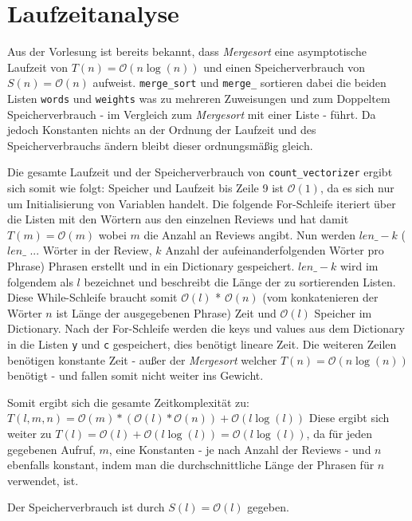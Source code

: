 \documentclass[ngerman]{scrartcl}
\newcommand{\code}{\texttt}
\begin{document}
\section{Laufzeitanalyse}
\label{sec:runtime}
Aus der Vorlesung ist bereits bekannt, dass \emph{Mergesort} eine asymptotische Laufzeit von $T(n) = \mathcal{O}(n\log(n))$ und einen Speicherverbrauch von $S(n) = \mathcal{O}(n)$ aufweist. 
\code{merge\_sort} und \code{merge\_} sortieren dabei die beiden Listen \code{words} und \code{weights} was zu mehreren Zuweisungen und zum Doppeltem Speicherverbrauch - im Vergleich zum \emph{Mergesort} mit einer Liste - führt. Da jedoch Konstanten nichts an der Ordnung der Laufzeit und des Speicherverbrauchs ändern bleibt dieser ordnungsmäßig gleich. 

Die gesamte Laufzeit und der Speicherverbrauch von \code{count\_vectorizer} ergibt sich somit wie folgt: Speicher und Laufzeit bis Zeile 9 ist $\mathcal{O}(1)$, da es sich nur um Initialisierung von Variablen handelt. Die folgende For-Schleife iteriert über die Listen mit den Wörtern aus den einzelnen Reviews und hat damit $T(m) = \mathcal{O}(m)$ wobei $m$ die Anzahl an Reviews angibt. Nun werden $len\_ - k$ ($len\_$ ... Wörter in der Review, $k$ Anzahl der aufeinanderfolgenden Wörter pro Phrase) Phrasen erstellt und in ein Dictionary gespeichert. $len\_-k$ wird im folgendem als $l$ bezeichnet und beschreibt die Länge der zu sortierenden Listen.
Diese While-Schleife braucht somit $\mathcal{O}(l)$ * $\mathcal{O}(n)$ (vom konkatenieren der Wörter $n$ ist Länge der ausgegebenen Phrase) Zeit und $\mathcal{O}(l)$ Speicher im Dictionary. 
Nach der For-Schleife werden die keys und values aus dem Dictionary in die Listen \code{y} und \code{c} gespeichert, dies benötigt lineare Zeit. Die weiteren Zeilen benötigen konstante Zeit - außer der \emph{Mergesort} welcher $T(n) = \mathcal{O}(n\log(n))$ benötigt - und fallen somit nicht weiter ins Gewicht. 

Somit ergibt sich die gesamte Zeitkomplexität zu: $T(l,m,n) = \mathcal{O}(m) * (\mathcal{O}(l) * \mathcal{O}(n)) + \mathcal{O}(l\log(l))$
Diese ergibt sich weiter zu $T(l) = \mathcal{O}(l) + \mathcal{O}(l\log(l)) = \mathcal{O}(l\log(l))$, da für jeden gegebenen Aufruf, $m$, eine Konstanten - je nach Anzahl der Reviews - und $n$ ebenfalls konstant, indem man die durchschnittliche Länge der Phrasen für $n$ verwendet, ist.


Der Speicherverbrauch ist durch $S(l) =\mathcal{O}(l)$ gegeben.
\end{document}
